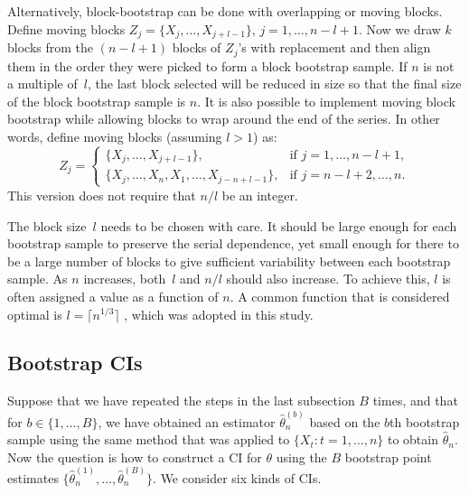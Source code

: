 \documentclass[12pt, letterpaper, titlepage]{article}
\begin{document}
Alternatively, block-bootstrap can be done with overlapping or moving blocks.
Define moving blocks $Z_j = \{X_j, \ldots, X_{j + l - 1}\}$,
$j = 1, \ldots, n - l + 1$. Now we draw $k$ blocks from the $(n - l + 1)$
blocks of $Z_j$'s with replacement and then align them in the order they were
picked to form a block bootstrap sample. If $n$ is not a multiple of~$l$, the
last block selected will be reduced in size so that the final size of the
block bootstrap sample is $n$. It is also possible to implement moving block
bootstrap while allowing blocks to wrap around the end of the series. In other
words, define moving blocks (assuming $l > 1$) as:
\begin{equation}
Z_j =
    \begin{cases}
        \{X_j, \ldots, X_{j + l - 1}\}, & \text{if } j = 1, \dots, n - l + 1,\\
        \{X_j, \ldots, X_n, X_1, \ldots, X_{j-n+l-1}\}, & \text{if } j = n - l
        + 2 ,\dots, n.
    \end{cases}
\end{equation}
This version does not require that $n/l$ be an integer.


The block size~$l$ needs to be chosen with care. It should be large enough for
each bootstrap sample to preserve the serial dependence, yet small enough for
there to be a large number of blocks to give sufficient variability between
each bootstrap sample. As $n$ increases, both~$l$ and $n / l$ should also
increase. To achieve this, $l$ is often assigned a value as a function of $n$.
A common function that is considered optimal is $l = \lceil n^{1/3} \rceil$
\citep{buhlmann1999block}, which was adopted in this study.


\subsection{Bootstrap CIs}


Suppose that we have repeated the steps in the last subsection $B$ times, and
that for $b \in \{1, \ldots, B\}$, we have obtained an estimator
$\hat\theta_n^{(b)}$ based on the $b$th bootstrap sample using the same method
that was applied to $\{X_t: t = 1, \ldots, n\}$ to obtain $\hat\theta_n$. Now
the question is how to construct a CI for $\theta$ using the $B$ bootstrap
point estimates $\{\hat\theta_n^{(1)}, \ldots, \hat\theta_n^{(B)}\}$. We
consider six kinds of CIs.
\end{document}
